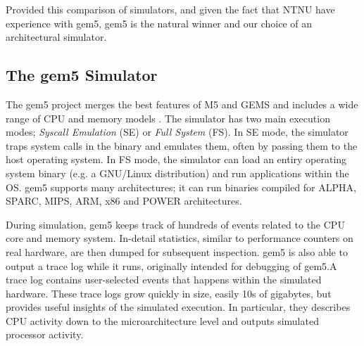 Provided this comparison of simulators, and given the fact that NTNU have
experience with gem5, gem5 is the natural winner and our choice of an
architectural simulator.


\subsection{The gem5 Simulator}

The gem5 project \cite{gem5} merges the best features of M5 \cite{binkert2006m5}
and GEMS \cite{GEMS} and includes a wide range of CPU and memory models
\cite{gem5hipeac}. The simulator has two main execution modes; \textit{Syscall
Emulation} (SE) or \textit{Full System} (FS). In SE mode, the simulator traps
system calls in the binary and emulates them, often by passing them to the host
operating system. In FS mode, the simulator can load an entiry operating system
binary (e.g. a GNU/Linux distribution) and run applications within the OS. gem5
supports many architectures; it can run binaries compiled for ALPHA, SPARC,
MIPS, ARM, x86 and POWER architectures.

During simulation, gem5 keeps track of hundreds of events related to the CPU
core and memory system. In-detail statistics, similar to performance counters on
real hardware, are then dumped for subsequent inspection. gem5 is also able to
output a trace log while it runs, originally intended for debugging of gem5.A
trace log contains user-selected events that happens within the simulated
hardware. These trace logs grow quickly in size, easily 10s of gigabytes, but
provides useful insights of the simulated execution. In particular, they describes
CPU activity down to the microarchitecture level and outputs simulated processor
activity.

